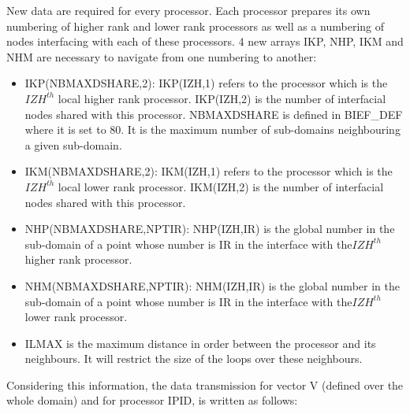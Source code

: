 New data are required for every processor. Each processor prepares its own
numbering of higher rank and lower rank processors as well as a numbering of
nodes interfacing with each of these processors. 4 new arrays IKP, NHP, IKM and
NHM are necessary to navigate from one numbering to another:
\begin{itemize}
  \item IKP(NBMAXDSHARE,2): IKP(IZH,1) refers to the processor which is the
    $IZH^{th} $ local higher rank processor. IKP(IZH,2) is the number of
    interfacial nodes shared with this processor. NBMAXDSHARE is defined in
    BIEF\_DEF where it is set to 80. It is the maximum number of sub-domains
    neighbouring a given sub-domain.
  \item IKM(NBMAXDSHARE,2): IKM(IZH,1) refers to the processor which is the
    $IZH^{th} $ local lower rank processor. IKM(IZH,2) is the number of
    interfacial nodes shared with this processor.
  \item NHP(NBMAXDSHARE,NPTIR): NHP(IZH,IR) is the global number in the
    sub-domain of a point whose number is IR in the interface with the$IZH^{th}
    $ higher rank processor.
  \item NHM(NBMAXDSHARE,NPTIR): NHM(IZH,IR) is the global number in the
    sub-domain of a point whose number is IR in the interface with the$IZH^{th}
    $ lower rank processor.
  \item ILMAX is the maximum distance in order between the processor and its
    neighbours. It will restrict the size of the loops over these neighbours.
\end{itemize}
Considering this information, the data transmission for vector V (defined over
the whole domain) and for processor IPID, is written as follows:
